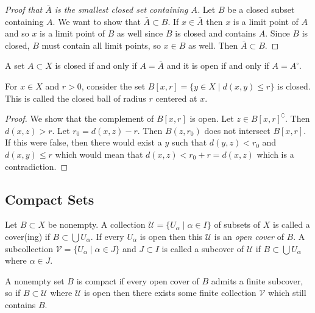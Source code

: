 \begin{proof}[Proof that $\bar{A}$ is the smallest closed set containing $A$]
Let $B$ be a closed subset containing $A$. We want to show that $\bar{A} \subset B$. If $x \in \bar{A}$ then $x$ is a limit point of $A$ and so $x$ is a limit point of $B$ as well since $B$ is closed and contains $A$. Since $B$ is closed, $B$ must contain all limit points, so $x \in B$ as well. Then $\bar{A} \subset B$.
\end{proof}

\begin{corollary}
A set $A \subset X$ is closed if and only if $A = \bar{A}$ and it is open if and only if $A = A^\circ$.
\end{corollary}

\begin{proposition}
For $x \in X$ and $r > 0$, consider the set $B[x,r] = \{y \in X \mid d(x,y) \leq r\}$ is closed. This is called the closed ball of radius $r$ centered at $x$.
\end{proposition}

\begin{proof}
We show that the complement of $B[x,r]$ is open. Let $z \in B[x,r]^\complement$. Then $d(x,z) > r$. Let $r_0 = d(x,z) - r$. Then $B(z,r_0)$ does not intersect $B[x,r]$. If this were false, then there would exist a $y$ such that $d(y,z) < r_0$ and $d(x,y) \leq r$ which would mean that $d(x,z) < r_0 + r = d(x,z)$ which is a contradiction.
\end{proof}

\subsection{Compact Sets}

\begin{definition}[Covering]
Let $B \subset X$ be nonempty. A collection $\mathcal{U} = \{U_\alpha \mid \alpha \in I\}$ of subsets of $X$ is called a cover(ing) if $B \subset \bigcup U_\alpha$. If every $U_\alpha$ is open then this $\mathcal{U}$ is an \emph{open cover} of $B$. A subcollection $\mathcal{V} = \{U_\alpha \mid \alpha \in J\}$ and $J \subset I$ is called a subcover of $\mathcal{U}$ if $B \subset \bigcup U_\alpha$ where $\alpha \in J$.
\end{definition}

\begin{definition}
A nonempty set $B$ is compact if every open cover of $B$ admits a finite subcover, so if $B \subset \mathcal{U}$ where $\mathcal{U}$ is open then there exists some finite collection $\mathcal{V}$ which still contains $B$.
\end{definition}


